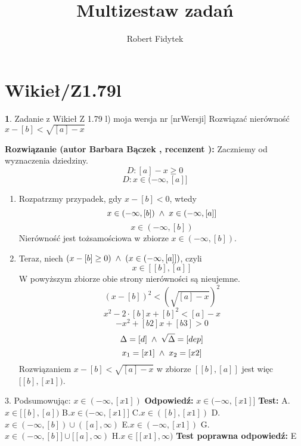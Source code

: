 \documentclass[12pt, a4paper]{article}
\title{Multizestaw zadań}
\author{Robert Fidytek}
\date{}
\theoremstyle{definition} %
\newtheorem{zad}{}
\newcommand{\kategoria}[1]{\section{#1}} %
\newcommand{\zadStart}[1]{\begin{zad}#1\newline} %
\newcommand{\zadStop}{\end{zad}}   %
\newcommand{\rozwStart}[2]{\noindent \textbf{Rozwiązanie (autor #1 , recenzent #2): }\newline} %
\newcommand{\rozwStop}{\newline}                                            %
\newcommand{\odpStart}{\noindent \textbf{Odpowiedź:}\newline}    %
\newcommand{\odpStop}{\newline}                                             %
\newcommand{\testStart}{\noindent \textbf{Test:}\newline} %
\newcommand{\testStop}{\newline} %
\newcommand{\kluczStart}{\noindent \textbf{Test poprawna odpowiedź:}\newline} %
\newcommand{\kluczStop}{\newline} %
\begin{document}
\maketitle


\kategoria{Wikieł/Z1.79l}
\zadStart{Zadanie z Wikieł Z 1.79 l) moja wersja nr [nrWersji]}
Rozwiązać nierówność $x-[b] < \sqrt{[a]-x}$
\zadStop
\rozwStart{Barbara Bączek}{}
Zaczniemy od wyznaczenia dziedziny.
$$D:[a]-x \geq 0 $$
$$D: x \in (-\infty, [a]]$$
\begin{enumerate}
\item Rozpatrzmy przypadek, gdy $x-[b]<0$, wtedy 
$$x \in (-\infty,[b]) \hspace{0.1 cm} \wedge \hspace{0.1 cm} x \in (-\infty, [a]]$$
$$x \in (-\infty,[b])$$
Nierówność jest tożsamościowa w zbiorze $ x \in (-\infty, [b])$.
\item Teraz, niech $(x-[b] \geq 0) \hspace{0.1 cm} \wedge \hspace{0.1 cm} (x \in (-\infty, [a]] )$, czyli
$$x \in [[b], [a]]$$
W powyższym zbiorze obie strony nierówności są nieujemne.
$${(x-[b])}^2<{( \sqrt{[a]-x})}^2$$
$$x^2-2 \cdot [b]x+{[b]}^2<[a]-x$$
$$-x^2 +[b2]x + [b3]>0$$
$$\Delta = [d] \hspace{0.1 cm} \wedge \hspace{0.1 cm} \sqrt{\Delta}=[dep]$$
$$x_1=[x1] \hspace{0.1 cm} \wedge \hspace{0.1cm}  x_2=[x2]$$
Rozwiązaniem $x-[b] < \sqrt{[a]-x}$ w zbiorze $[[b], [a]]$ jest więc $[[b], [x1])$.
\end{enumerate}
3. Podsumowując: $x \in (-\infty, [x1])$
\rozwStop
\odpStart
$x \in (-\infty, [x1]]$
\odpStop
\testStart
A.$x \in [[b],[a])$
B.$x \in (-\infty, [x1]]$
C.$x \in ([b], [x1])$
D.$x \in (-\infty,[b]) \cup ([a], \infty)$
E.$x \in (-\infty, [x1])$
G.$x \in (-\infty,[b]] \cup [[a], \infty)$
H.$x \in [[x1], \infty)$
\testStop
\kluczStart
E
\kluczStop
\end{document}
